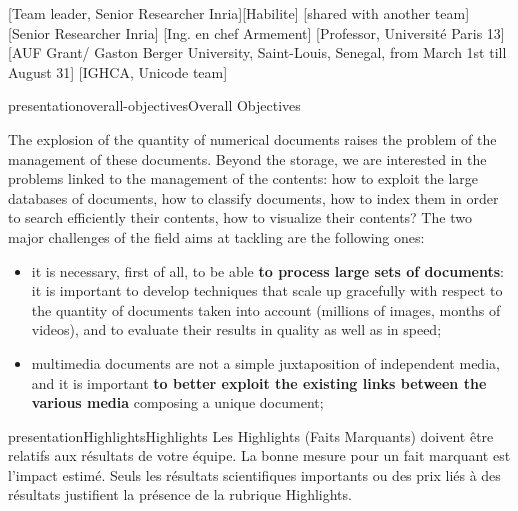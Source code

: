 \documentclass{ra2011}
\begin{document}
\begin{composition}
       [Team leader, Senior Researcher Inria][Habilite]
       [shared with another team]
       [Senior Researcher Inria]
       [Ing. en chef Armement]
       [Professor, Université Paris 13]
       [AUF Grant/ Gaston Berger University, Saint-Louis, Senegal, from March 1st till August 31]
       [IGHCA, Unicode team]
\end{composition}



\begin{module}{presentation}{overall-objectives}{Overall Objectives}

  The explosion of the quantity of numerical documents raises the problem
  of the management of these documents. Beyond the storage,
  we are interested in the problems linked to the management of the contents: 
  how to exploit the large databases of documents, how to classify documents, how to
  index them in order to search efficiently their contents, how to visualize
  their contents? 
  The two major challenges of the field  aims at tackling are the following ones:
  \begin{itemize} 
  \item it is necessary, first of all, to be able {\bf to
      process large sets of documents}: it is important to develop techniques
    that scale up gracefully with respect to the quantity of documents
    taken into account (millions of images, months of videos), and to evaluate
    their results in quality as well as in speed;
    
  \item  multimedia documents are not a simple juxtaposition of
    independent media, and it is important {\bf to better exploit the
      existing links between the various media} composing a unique
    document;
  \end{itemize}
\end{module}

\begin{module}{presentation}{Highlights}{Highlights}
Les  Highlights (Faits Marquants) doivent être relatifs aux résultats de votre équipe. La bonne mesure pour un fait marquant est l'impact estimé. Seuls les résultats scientifiques importants ou des prix liés à des résultats justifient la présence de la rubrique Highlights.
\end{module}
\end{document}
